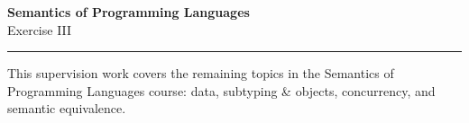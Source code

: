 \documentclass[10pt,a4paper]{exam} %
\begin{document}
\newcommand{\course}{Semantics of Programming Languages}
\newcommand{\week}{III}
\newcommand{\topics}{Data, Subtyping \& Objects, Semantic Equivalence, and Concurrency}





\marksnotpoints
\pointsdroppedatright
\marksnotpoints
\marginpointname{ \points}

\begin{center}
\LARGE {\textbf{\color{campurpledark} \course} }\\[-0.2cm]
\Large \color{campurpledark} Exercise \week\\
\end{center}

{\color{campurple}\hrule}

\newcommand{\metavar}[1]{{\color{campurple}#1}}

\vspace{0.5cm}

This supervision work covers the remaining topics in the Semantics of Programming Languages course: data, subtyping \& objects, concurrency, and semantic equivalence.
\end{document}
